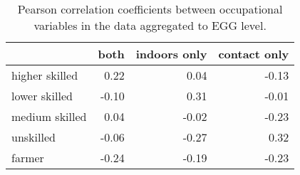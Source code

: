 \begin{table}

\caption{Pearson correlation coefficients between occupational variables in the data aggregated to EGG level.}
\centering
\begin{tabular}[t]{l|r|r|r}
\hline
  & both & indoors only & contact only\\
\hline
higher skilled & 0.22 & 0.04 & -0.13\\
\hline
lower skilled & -0.10 & 0.31 & -0.01\\
\hline
medium skilled & 0.04 & -0.02 & -0.23\\
\hline
unskilled & -0.06 & -0.27 & 0.32\\
\hline
farmer & -0.24 & -0.19 & -0.23\\
\hline
\end{tabular}
\end{table}
